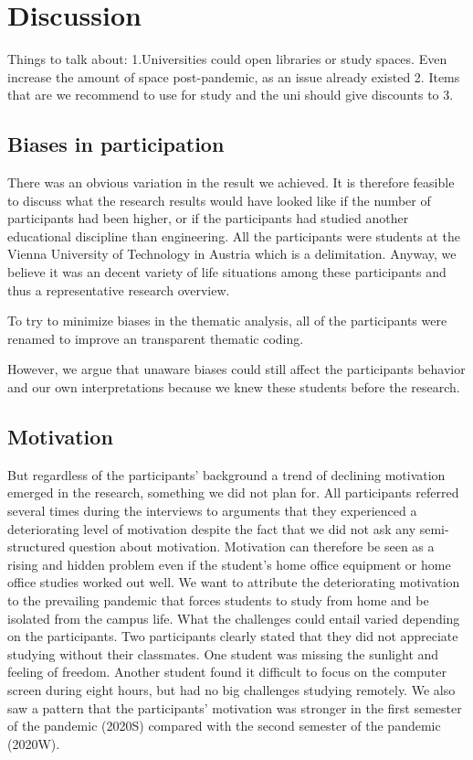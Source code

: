 \documentclass{sigchi}
\begin{document}
\section{Discussion}

Things to talk about: 
1.Universities could open libraries or study spaces. Even increase the amount of space post-pandemic, as an issue already existed
2. Items that are we recommend to use for study and the uni should give discounts to
3. 

\subsection{Biases in participation}
There was an obvious variation in the result we achieved. It is therefore feasible to discuss what the research results would have looked like if the number of participants had been higher, or if the participants had studied another educational discipline than engineering. All the participants were students at the Vienna University of Technology in Austria which is a delimitation. Anyway, we believe it was an decent variety of life situations among these participants and thus a representative research overview.

To try to minimize biases in the thematic analysis, all of the participants were renamed to improve an transparent thematic coding. 

However, we argue that unaware biases could still affect the participants behavior and our own interpretations because we knew these students before the research. 

\subsection{Motivation}
But regardless of the participants' background a trend of declining motivation emerged in the research, something we did not plan for. All participants referred several times during the interviews to arguments that they experienced a deteriorating level of motivation despite the fact that we did not ask any semi-structured question about motivation. Motivation can therefore be seen as a rising and hidden problem even if the student's home office equipment or home office studies worked out well. We want to attribute the deteriorating motivation to the prevailing pandemic that forces students to study from home and be isolated from the campus life. What the challenges could entail varied depending on the participants. Two participants clearly stated that they did not appreciate studying without their classmates. One student was missing the sunlight and feeling of freedom. Another student found it difficult to focus on the computer screen during eight hours, but had no big challenges studying remotely. We also saw a pattern that the participants' motivation was stronger in the first semester of the pandemic (2020S) compared with the second semester of the pandemic (2020W).
\end{document}
